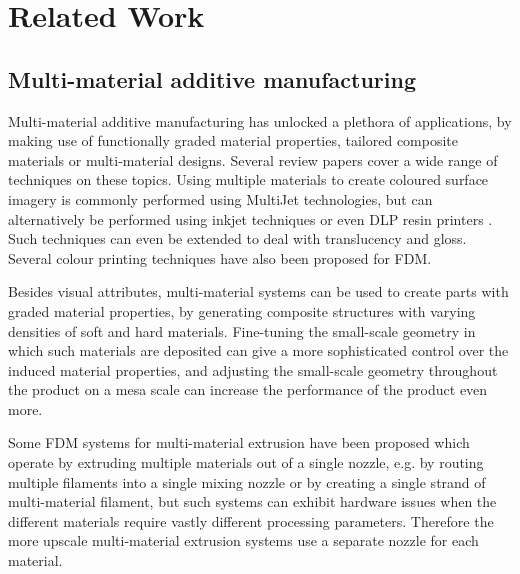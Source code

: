 \section{Related Work}

\subsection{Multi-material additive manufacturing}
Multi-material additive manufacturing has unlocked a plethora of applications, by making use of functionally graded material properties, tailored composite materials or multi-material designs.
Several review papers cover a wide range of techniques on these topics.\cite{Vaezi2013,Rafiee2020}
Using multiple materials to create coloured surface imagery is commonly performed using MultiJet technologies, but can alternatively be performed using inkjet techniques\cite{sachs1994three} or even DLP resin printers \cite{Zhou2011Development}.
Such techniques can even be extended to deal with translucency\cite{Brunton2018} and gloss\cite{elkhuizen2019gloss}.
Several colour printing techniques have also been proposed for FDM.\cite{reiner2014dual,Song2019,Kuipers2018}

Besides visual attributes, multi-material systems can be used to create parts with graded material properties, by generating composite structures with varying densities of soft and hard materials.\cite{Cho2003851}
Fine-tuning the small-scale geometry in which such materials are deposited can give a more sophisticated control over the induced material properties,\cite{Leung2019,mirzaali2020}
and adjusting the small-scale geometry throughout the product on a mesa scale can increase the performance of the product even more.\cite{Zhu2017}

Some FDM systems for multi-material extrusion have been proposed which operate by extruding multiple materials out of a single nozzle, e.g. by routing multiple filaments into a single mixing nozzle\cite{diamondhotend} or by creating a single strand of multi-material filament\cite{Takahashi2020,Mosaic2015},
but such systems can exhibit hardware issues when the different materials require vastly different processing parameters.
Therefore the more upscale multi-material extrusion systems use a separate nozzle for each material.\cite{UltimakerS5}




